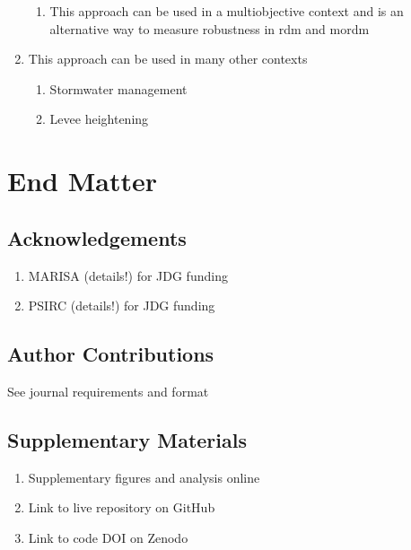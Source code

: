 \documentclass[12pt]{article}
\begin{document}
\begin{enumerate}
\begin{enumerate}
              \item This approach can be used in a multiobjective context and is an alternative way to measure robustness in \gls{rdm} and \gls{mordm}
          \end{enumerate}
    \item This approach can be used in many other contexts
          \begin{enumerate}
              \item Stormwater management \citep{sharma_stormwater:2021,lopez-cantu:2018}
              \item Levee heightening \citep{garner_slrise:2018,oddo_coastal:2017,vandantzig_dike:1956}
          \end{enumerate}
\end{enumerate}

\section{End Matter}

\subsection{Acknowledgements}

\begin{enumerate}
    \item MARISA (details!) for JDG funding
    \item PSIRC (details!) for JDG funding
\end{enumerate}

\subsection{Author Contributions}

See journal requirements and format

\subsection{Supplementary Materials}

\begin{enumerate}
    \item Supplementary figures and analysis online
    \item Link to live repository on GitHub
    \item Link to code DOI on Zenodo
\end{enumerate}

\printbibliography
\end{document}
